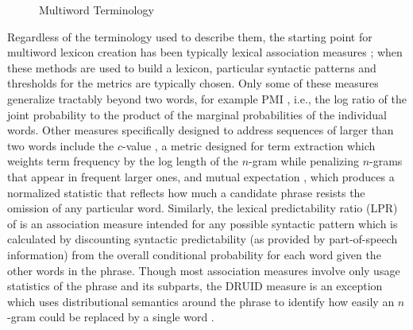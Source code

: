 \documentclass[11pt,letterpaper]{article}
\begin{document}
\begin{figure}[!t]
\caption{Multiword Terminology}
\label{fig:terminology}
\end{figure}



Regardless of the terminology used to describe them, the starting point for multiword lexicon creation has been typically lexical association measures \cite{Church90,Dunning93,Schone01,Evert04,Pecina10,DeAraujo11,Kulkarni11,Ramisch14}; when these methods are used to build a lexicon, particular syntactic patterns and thresholds for the metrics are typically chosen. Only some of these measures generalize tractably beyond two words, for example PMI \cite{Church90}, i.e., the log ratio of the joint probability to the product of the marginal probabilities of the individual words. Other measures specifically designed to address sequences of larger than two words include the $c$-value \cite{Frantzi00}, a metric designed for term extraction which weights term frequency by the log length of the $n$-gram while penalizing $n$-grams that appear in frequent larger ones, and mutual expectation \cite{Dias99}, which produces a normalized statistic that reflects how much a candidate phrase resists the omission of any particular word. Similarly, the lexical predictability ratio (LPR) of  is an association measure intended for any possible syntactic pattern which is calculated by discounting syntactic predictability (as provided by part-of-speech information) from the overall conditional probability for each word given the other words in the phrase. Though most association measures involve only usage statistics of the phrase and its subparts, the DRUID measure is an exception which uses distributional semantics around the phrase to identify how easily an $n$-gram could be replaced by a single word \cite{Riedl15}.
\end{document}
